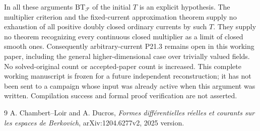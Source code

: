\documentclass[11pt]{article}
\newcommand{\BT}{\mathrm{BT}}
\begin{document}
In all these arguments $\BT_{\mathcal F}$ of the initial $T$ is an
explicit hypothesis. The multiplier criterion and the fixed-current
approximation theorem supply no exhaustion of all positive doubly
closed ordinary currents by such $T$. They supply no theorem recognizing
every continuous closed multiplier as a limit of closed smooth ones.
Consequently arbitrary-current P21.3 remains open in this working paper,
including the general higher-dimensional case over trivially valued
fields. No solved-original count or accepted-paper count is increased.
This complete working manuscript is frozen for a future independent
reconstruction; it has not been sent to a campaign whose input was
already active when this argument was written. Compilation success and
formal proof verification are not asserted.

\begin{thebibliography}{9}
A. Chambert--Loir and A. Ducros,
\emph{Formes diff\'erentielles r\'eelles et courants sur les espaces de
Berkovich}, arXiv:1204.6277v2, 2025 version.
\end{thebibliography}
\end{document}
